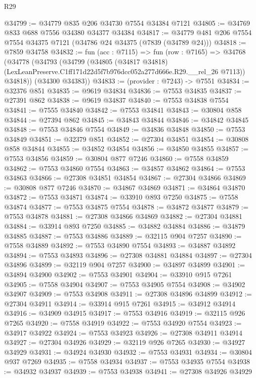 \begin{lexlean}{R29}
\begin{coremodule}
@34799 := @34779 @835 @206 @34730 @7554 @34384 @7121
@34805 := @34769 @833 @688 @7556 @34380 @34377 @34384
@34817 := @34779 @481 @206 @7554 @7554 @34375 @7121 (@34786 @24 @34375 (@7839 (@34789 @24)))
@34818 := @7859 @34758
@34832 := fun (acc : @7115) =>
  fun (row : @7165) =>
  @34768
    (@34778
      (@34793
        (@34799
          (@34805
            (@34817 @34818)
            (LexLeanPreserve.C1ff171d22d5f7b976dcc052a277d666e.R29.__rel_26 @7113))
          @34818))
      (@34300 @34383))
@34833 := (provider : @7243) -> @7551
@34834 := @32376 @851
@34835 := @9619 @34834
@34836 := @7553 @34835
@34837 := @27391 @862
@34838 := @9619 @34837
@34840 := @7553 @34838 @7554
@34841 := @7555 @34840
@34842 := @7553 @34841
@34843 := @30804 @858
@34844 := @27394 @862
@34845 := @34843 @34844
@34846 := @34842 @34845
@34848 := @7553 @34846 @7554
@34849 := @34836 @34848
@34850 := @7553 @34849
@34851 := @32379 @851
@34852 := @27304 @34851
@34854 := @30808 @858 @34844
@34855 := @34852 @34854
@34856 := @34850 @34855
@34857 := @7553 @34856
@34859 := @30804 @877 @7246
@34860 := @7558 @34859
@34862 := @7553 @34860 @7554
@34863 := @34857 @34862
@34864 := @7553 @34863
@34866 := @27308 @34851 @34854
@34867 := @27304 @34866
@34869 := @30808 @877 @7246
@34870 := @34867 @34869
@34871 := @34864 @34870
@34872 := @7553 @34871
@34874 := @33910 @893 @7250
@34875 := @7558 @34874
@34877 := @7553 @34875 @7554
@34878 := @34872 @34877
@34879 := @7553 @34878
@34881 := @27308 @34866 @34869
@34882 := @27304 @34881
@34884 := @33914 @893 @7250
@34885 := @34882 @34884
@34886 := @34879 @34885
@34887 := @7553 @34886
@34889 := @32115 @904 @7257
@34890 := @7558 @34889
@34892 := @7553 @34890 @7554
@34893 := @34887 @34892
@34894 := @7553 @34893
@34896 := @27308 @34881 @34884
@34897 := @27304 @34896
@34899 := @32119 @904 @7257
@34900 := @34897 @34899
@34901 := @34894 @34900
@34902 := @7553 @34901
@34904 := @33910 @915 @7261
@34905 := @7558 @34904
@34907 := @7553 @34905 @7554
@34908 := @34902 @34907
@34909 := @7553 @34908
@34911 := @27308 @34896 @34899
@34912 := @27304 @34911
@34914 := @33914 @915 @7261
@34915 := @34912 @34914
@34916 := @34909 @34915
@34917 := @7553 @34916
@34919 := @32115 @926 @7265
@34920 := @7558 @34919
@34922 := @7553 @34920 @7554
@34923 := @34917 @34922
@34924 := @7553 @34923
@34926 := @27308 @34911 @34914
@34927 := @27304 @34926
@34929 := @32119 @926 @7265
@34930 := @34927 @34929
@34931 := @34924 @34930
@34932 := @7553 @34931
@34934 := @30804 @937 @7269
@34935 := @7558 @34934
@34937 := @7553 @34935 @7554
@34938 := @34932 @34937
@34939 := @7553 @34938
@34941 := @27308 @34926 @34929

\end{coremodule}
\end{lexlean}
